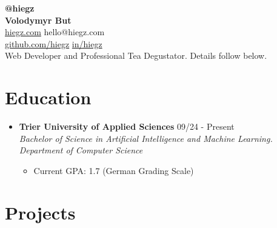\documentclass[]{article}
\begin{document}
\begin{center}
    \textbf{\Large @hiegz} \\[3pt]
    \textbf{\huge Volodymyr But} \\[7pt]

     \href{https://www.hiegz.com}{hiegz.com}
    \hspace{5pt}
     hello@hiegz.com \\[2pt]

     \href{https://github.com/hiegz}{github.com/hiegz}
    \hspace{5pt}
     \href{https://linkedin.com/in/hiegz}{in/hiegz} \\[10pt]

    Web Developer and Professional Tea Degustator. Details follow below.
\end{center}

\section{Education}

\begin{itemize}[leftmargin=0.15in, rightmargin=0.15in, label={}]
    \item {\large\bfseries Trier University of Applied Sciences} \hfill 09/24 - Present \\
        {\itshape Bachelor of Science in Artificial Intelligence and Machine Learning. \\ Department of Computer Science}

        \begin{itemize}
            \item Current GPA: 1.7 (German Grading Scale)
        \end{itemize}
\end{itemize}

\section{Projects}
\end{document}
